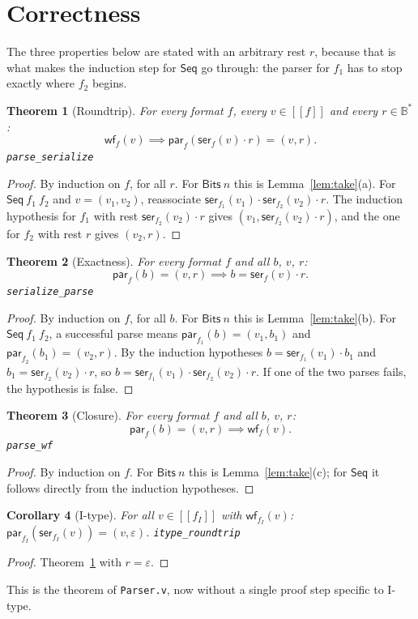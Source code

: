 \documentclass[11pt,a4paper]{article}
\theoremstyle{plain}
\newtheorem{theorem}{Theorem}
\newtheorem{corollary}[theorem]{Corollary}
\theoremstyle{definition}
\theoremstyle{remark}
\newcommand{\B}{\mathbb{B}}
\newcommand{\ser}{\mathsf{ser}}
\newcommand{\parse}{\mathsf{par}}
\newcommand{\wf}{\mathsf{wf}}
\newcommand{\sem}[1]{[\![ #1 ]\!]}
\newcommand{\Bits}{\mathsf{Bits}}
\newcommand{\Seq}{\mathsf{Seq}}
\newcommand{\code}[1]{\texttt{#1}}
\begin{document}
\section{Correctness}

The three properties below are stated with an arbitrary rest $r$, because that is what makes the induction step for $\Seq$ go through: the parser for $f_1$ has to stop exactly where $f_2$ begins.

\begin{theorem}[Roundtrip]\label{thm:R}
For every format $f$, every $v\in\sem{f}$ and every $r\in\B^*$:
\[ \wf_f(v) \implies \parse_f(\ser_f(v)\cdot r)=(v,r). \] \hfill\code{parse\_serialize}
\end{theorem}
\begin{proof}
By induction on $f$, for all $r$. For $\Bits\ n$ this is Lemma~\ref{lem:take}(a). For $\Seq\ f_1\ f_2$ and $v=(v_1,v_2)$, reassociate $\ser_{f_1}(v_1)\cdot\ser_{f_2}(v_2)\cdot r$. The induction hypothesis for $f_1$ with rest $\ser_{f_2}(v_2)\cdot r$ gives $(v_1,\ser_{f_2}(v_2)\cdot r)$, and the one for $f_2$ with rest $r$ gives $(v_2,r)$.
\end{proof}

\begin{theorem}[Exactness]\label{thm:S}
For every format $f$ and all $b$, $v$, $r$:
\[ \parse_f(b)=(v,r) \implies b=\ser_f(v)\cdot r. \] \hfill\code{serialize\_parse}
\end{theorem}
\begin{proof}
By induction on $f$, for all $b$. For $\Bits\ n$ this is Lemma~\ref{lem:take}(b). For $\Seq\ f_1\ f_2$, a successful parse means $\parse_{f_1}(b)=(v_1,b_1)$ and $\parse_{f_2}(b_1)=(v_2,r)$. By the induction hypotheses $b=\ser_{f_1}(v_1)\cdot b_1$ and $b_1=\ser_{f_2}(v_2)\cdot r$, so $b=\ser_{f_1}(v_1)\cdot\ser_{f_2}(v_2)\cdot r$. If one of the two parses fails, the hypothesis is false.
\end{proof}

\begin{theorem}[Closure]\label{thm:C}
For every format $f$ and all $b$, $v$, $r$:
\[ \parse_f(b)=(v,r) \implies \wf_f(v). \] \hfill\code{parse\_wf}
\end{theorem}
\begin{proof}
By induction on $f$. For $\Bits\ n$ this is Lemma~\ref{lem:take}(c); for $\Seq$ it follows directly from the induction hypotheses.
\end{proof}

\begin{corollary}[I-type]
For all $v\in\sem{f_I}$ with $\wf_{f_I}(v)$: $\parse_{f_I}(\ser_{f_I}(v))=(v,\varepsilon)$. \hfill\code{itype\_roundtrip}
\end{corollary}
\begin{proof}
Theorem~\ref{thm:R} with $r=\varepsilon$.
\end{proof}

This is the theorem of \code{Parser.v}, now without a single proof step specific to I-type.
\end{document}
